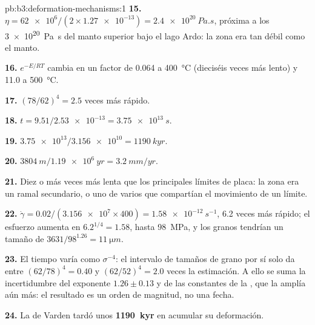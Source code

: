 \begin{solution}{pb:b3:deformation-mechanisms:1}
\textbf{15.} $\eta = \num{62e6}/(2\times\num{1.27e-13}) = \qty{2.4e20}{Pa.s}$,
próxima a los \qty{3e20}{Pa.s} del manto superior bajo el lago Ardo: la zona
era tan débil como el manto.

\textbf{16.} $e^{-E/RT}$ cambia en un factor de 0.064 a \qty{400}{\celsius}
(dieciséis veces más lento) y 11.0 a \qty{500}{\celsius}.

\textbf{17.} $(78/62)^4 = 2.5$ veces más rápido.

\textbf{18.} $t = 9.51/\num{2.53e-13} = \qty{3.75e13}{s}$.

\textbf{19.} $\num{3.75e13}/\num{3.156e10} = \qty{1190}{kyr}$.

\textbf{20.} $\qty{3804}{m}/\qty{1.19e6}{yr} = \qty{3.2}{mm/yr}$.

\textbf{21.} Diez o más veces más lenta que los principales límites de placa: la zona
era un ramal secundario, o uno de varios que compartían el movimiento de un límite.

\textbf{22.} $\dot\gamma = 0.02/(\num{3.156e7}\times400) = \qty{1.58e-12}{s^{-1}}$,
6.2 veces más rápido; el esfuerzo aumenta en $6.2^{1/4} = 1.58$, hasta \qty{98}{MPa}, y
los granos tendrían un tamaño de $3631/98^{1.26} = \qty{11}{\micro m}$.

\textbf{23.} El tiempo varía como $\sigma^{-4}$: el intervalo de tamaños de grano por sí solo da
entre $(62/78)^4 = 0.40$ y $(62/52)^4 = 2.0$ veces la estimación. A ello se suma la
incertidumbre del exponente $1.26 \pm 0.13$ y de las constantes de la , que
la amplía aún más: el resultado es un orden de magnitud, no una fecha.

\textbf{24.} La  de Varden tardó unos
\textbf{\qty[text-series-to-math=true]{1190}{kyr}} en acumular su deformación.
\end{solution}
